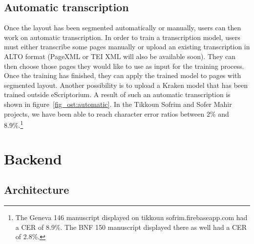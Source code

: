 \subsection{Automatic transcription}

Once the layout has been segmented automatically or manually, users can then
work on automatic transcription. In order to train a transcription model, users
must either transcribe some pages manually or upload an existing transcription
in ALTO format (PageXML or TEI XML will also be available soon). They can then
choose those pages they would like to use as input for the training process.
Once the training has finished, they can apply the trained model to pages with
segmented layout. Another possibility is to upload a Kraken model that has been
trained outside eScriptorium. A result of such an automatic transcription is
shown in figure~\ref{fig_ost:automatic}. In the Tikkoun Sofrim and Sofer Mahir projects, we have been
able to reach character error ratios between 2\% and 8.9\%.\footnote{The Geneva
146 manuscript displayed on tikkoun sofrim.firebaseapp.com had a CER of 8.9\%.
The BNF 150 manuscript displayed there as well had a CER of 2.8\%.}

\section{Backend}

\subsection{Architecture}

